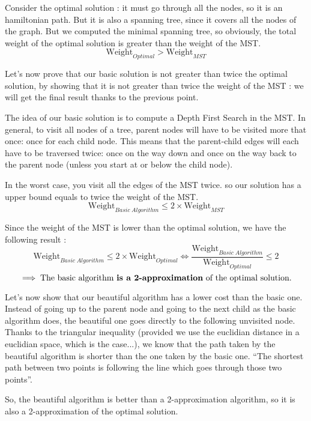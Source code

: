 \documentclass[11pt]{article}
\begin{document}
Consider the optimal solution : it must go through all the nodes, so it is an hamiltonian path. But it is also a spanning tree, since it covers all the nodes of the graph.
But we computed the minimal spanning tree, so obviously, the total weight of the optimal solution is greater than the weight of the MST.
\[
	\text{Weight}_{Optimal} > \text{Weight}_{MST}
\]

Let's now prove that our basic solution is not greater than twice the optimal solution, by showing that it is not greater than twice the weight of the MST : we will get the final result thanks to the previous point.

The idea of our basic solution is to compute a Depth First Search in the MST.
In general, to visit all nodes of a tree, parent nodes will have to be visited more that once: once for each child node. This means that the parent-child edges will each have to be traversed twice: once on the way down and once on the way back to the parent node (unless you start at or below the child node).

In the worst case, you visit all the edges of the MST twice. so  our solution has a upper bound equals to twice the weight of the MST.
\[
	\text{Weight}_{Basic \; Algorithm} \leq 2 \times \text{Weight}_{MST}
\]

Since the weight of the MST is lower than the optimal solution, we have the following result :
\[
	\text{Weight}_{Basic \; Algorithm} \leq 2 \times \text{Weight}_{Optimal} \iff \boxed{\frac{\text{Weight}_{Basic \; Algorithm}}{\text{Weight}_{Optimal}} \leq 2}
\]
\[
	\implies \text{The basic algorithm \textbf{is a 2-approximation} of the optimal solution.}
\]


Let's now show that our beautiful algorithm has a lower cost than the basic one. Instead of going up to the parent node and going to the next child as the basic algorithm does, the beautiful one goes directly to the following unvisited node.
Thanks to the triangular inequality (provided we use the euclidian distance in a euclidian space, which is the case...), we know that the path taken by the beautiful algorithm is shorter than the one taken by the basic one.
``The shortest path between two points is following the line which goes through those two points''.

So, the beautiful algorithm is better than a 2-approximation algorithm, so it is also a 2-approximation of the optimal solution.
\end{document}
